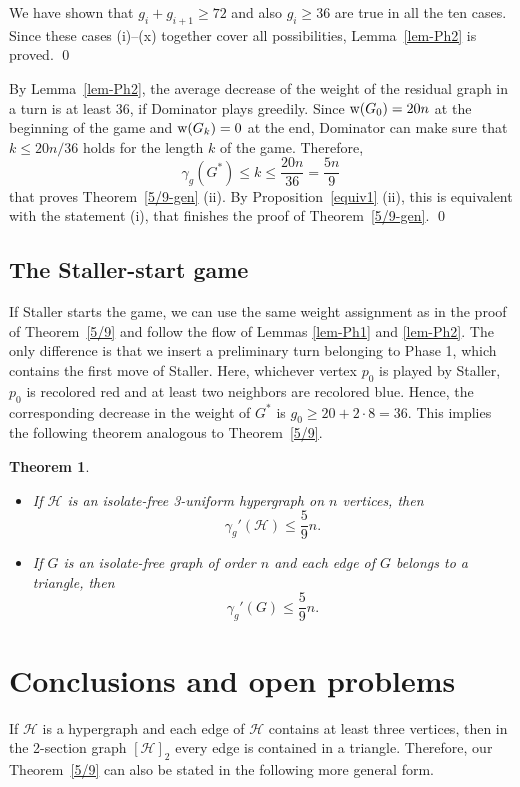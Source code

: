 \documentclass[12pt]{article}
\newtheorem{theorem}{Theorem}[section]
\newcommand{\w}{{\rm w}}
\newcommand\cH{{\mathcal H}}
\begin{document}
 We have shown that $g_i +g_{i+1}\ge 72$ and also $g_i \ge 36$ are true in all the ten cases. Since these cases (i)--(x) together cover all possibilities,  Lemma~\ref{lem-Ph2} is proved. \qed
 
 \medskip
 
By  Lemma~\ref{lem-Ph2}, the average decrease of the weight of the residual graph in a turn is at least $36$, if Dominator plays greedily. Since $\w(G_0)=20n$ at the beginning of the game and $\w(G_k)=0$ at the end, Dominator can make sure that $k \le 20n/36$ holds for the length $k$ of the game. Therefore, 
$$ \gamma_g(G^*)\le k  \le \frac{20n}{36}= \frac{5n}{9}$$
that proves Theorem~\ref{5/9-gen} (ii).
By Proposition~\ref{equiv1} (ii), this is equivalent with the statement (i), that finishes the proof of Theorem~\ref{5/9-gen}. \qed 

\subsection*{The Staller-start game}

If Staller starts the game, we can use the same weight assignment as in the proof of Theorem~\ref{5/9} and follow the flow of Lemmas \ref{lem-Ph1} and \ref{lem-Ph2}. The only difference is that we insert a preliminary turn belonging to Phase 1, which contains the first move of Staller. Here, whichever vertex $p_0$ is played by Staller, $p_0$ is recolored red and at least two neighbors are recolored blue. Hence, the corresponding decrease in the weight of $G^*$ is $g_0 \ge 20+2\cdot 8=36$. This implies the following theorem analogous to Theorem~\ref{5/9}.

\begin{theorem} \label{5/9-Staller}
\begin{itemize}
\item[$(i)$]
If $\cH$ is an isolate-free 3-uniform hypergraph on $n$ vertices, then
$$\gamma_g'(\cH)\le \frac{5}{9}n.$$
\item[$(ii)$] 
If $G$ is an isolate-free graph of order
$n$ and each edge of $G$ belongs to a triangle, then
$$\gamma_g'(G)\le \frac{5}{9}n.$$
\end{itemize}
\end{theorem}
\medskip


\section{Conclusions and open problems}

If $\cH$ is a hypergraph and each edge of $\cH$ contains at least three vertices, then in the 2-section graph $[\cH]_2$  every edge is contained in a triangle. Therefore, our Theorem~\ref{5/9} can also be stated in the following more general form.
\end{document}
